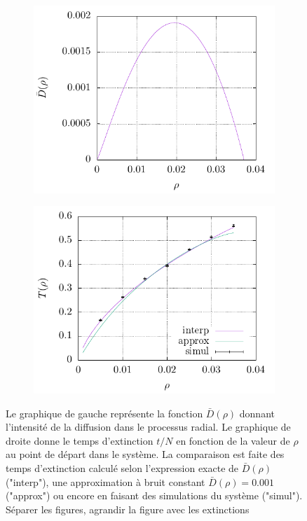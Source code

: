 \documentclass[openany,a4paper,12pt]{article}
\begin{document}
\begin{figure}
	\centering
	\begin{subfigure}{.5\textwidth}
		\centering
		\includegraphics[width=\linewidth]{figures/D_rho}
	\end{subfigure}%
	\begin{subfigure}{.5\textwidth}
		\centering
		\includegraphics[width=\linewidth]{figures/extc_time_comparison}
	\end{subfigure}%
	\caption{Le graphique de gauche représente la fonction $\bar D(\rho)$ donnant l'intensité de la diffusion dans le processus radial. Le graphique de droite donne le temps d'extinction $t/N$ en fonction de la valeur de $\rho$ au point de départ dans le système. La comparaison est faite des temps d'extinction calculé selon l'expression exacte de $\bar D(\rho)$ ("interp"), une approximation à bruit constant $\bar D(\rho)=0.001$ ("approx") ou encore en faisant des simulations du système ("simul"). {\color{red} Séparer les figures, agrandir la figure avec les extinctions}}
	\label{fig:D_rho_et_extc}
\end{figure}
\end{document}
